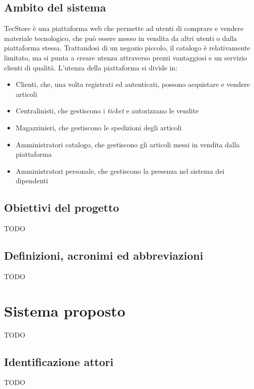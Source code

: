 \documentclass[12pt,a4paper]{article}
\begin{document}
\subsection{Ambito del sistema}
TecStore è una piattaforma web che permette ad utenti di comprare e vendere materiale tecnologico, che può essere messo in vendita da altri utenti o dalla piattaforma stessa. Trattandosi di un negozio piccolo, il catalogo è relativamente limitato, ma si punta a creare utenza attraverso prezzi vantaggiosi e un servizio clienti di qualità.
L'utenza della piattaforma si divide in:
\begin{itemize}
\item Clienti, che, una volta registrati ed autenticati, possono acquistare e vendere articoli
\item Centralinisti, che gestiscono i \emph{ticket} e autorizzano le vendite
\item Magazzinieri, che gestiscono le spedizioni degli articoli
\item Amministratori catalogo, che gestiscono gli articoli messi in vendita dalla piattaforma
\item Amministratori personale, che gestiscono la presenza nel sistema dei dipendenti
\end{itemize}

\subsection{Obiettivi del progetto}
 TODO

\subsection{Definizioni, acronimi ed abbreviazioni}
 TODO

\section{Sistema proposto}
 TODO
 
\subsection{Identificazione attori}
 TODO
 
\end{document}
